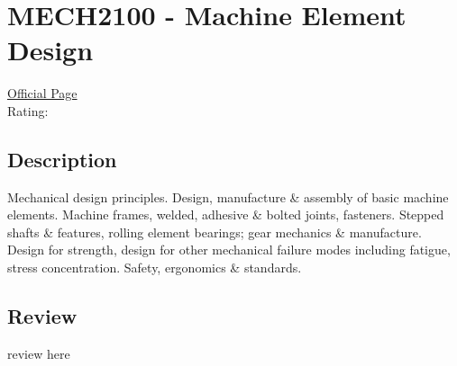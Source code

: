 \hypertarget{MECH2100}{\section{MECH2100 - Machine Element Design}}

\large
\textcolor{turbo_purple}{\href{https://my.uq.edu.au/programs-courses/course.html?course_code=MECH2100}{Official Page}} \\
Rating: \cstar\cstar\cstar\cstar\ostar

\normalsize
\subsection*{Description}
Mechanical design principles.
Design, manufacture \& assembly of basic machine elements.
Machine frames, welded, adhesive \& bolted joints, fasteners.
Stepped shafts \& features, rolling element bearings; gear mechanics \& manufacture.
Design for strength, design for other mechanical failure modes including fatigue, stress concentration.
Safety, ergonomics \& standards.

\subsection*{Review}
review here
